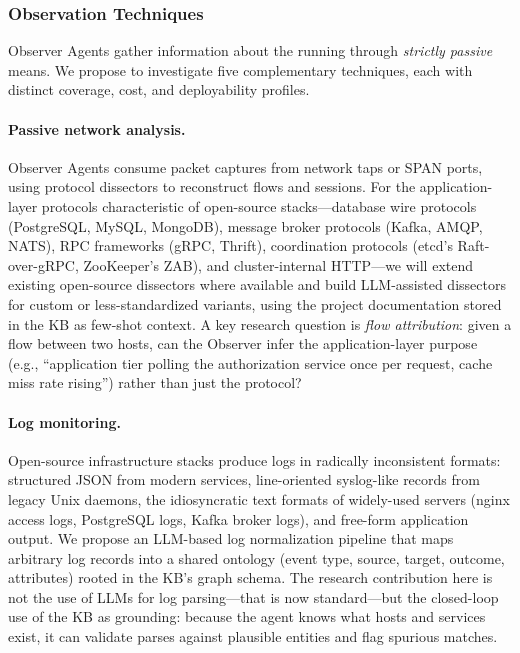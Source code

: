 \subsubsection{Observation Techniques}

Observer Agents gather information about the running \cps through
\emph{strictly passive} means. We propose to investigate five
complementary techniques, each with distinct coverage, cost, and
deployability profiles.

\paragraph{Passive network analysis.}
Observer Agents consume packet captures from network taps or SPAN
ports, using protocol dissectors to reconstruct flows and sessions.
For the application-layer protocols characteristic of open-source
stacks---database wire protocols (PostgreSQL, MySQL, MongoDB), message
broker protocols (Kafka, AMQP, NATS), RPC frameworks (gRPC,
Thrift), coordination protocols (etcd's Raft-over-gRPC,
ZooKeeper's ZAB), and cluster-internal HTTP---we will extend
existing open-source dissectors where available and build LLM-assisted
dissectors for custom or less-standardized variants, using the project
documentation stored in the KB as few-shot context. A key research
question is \emph{flow attribution}: given a flow between two hosts,
can the Observer infer the application-layer purpose (e.g.,
``application tier polling the authorization service once per request,
cache miss rate rising'') rather than just the protocol?

\paragraph{Log monitoring.}
Open-source infrastructure stacks produce logs in radically
inconsistent formats: structured JSON from modern services, line-oriented
syslog-like records from legacy Unix daemons, the idiosyncratic
text formats of widely-used servers (nginx access logs, PostgreSQL
logs, Kafka broker logs), and free-form application output. We
propose an LLM-based log normalization pipeline that
maps arbitrary log records into a shared ontology (event type,
source, target, outcome, attributes) rooted in the KB's graph schema.
The research contribution here is not the use of LLMs for
log parsing---that is now standard---but the closed-loop use of the KB
as grounding: because the agent knows what hosts and services exist,
it can validate parses against plausible entities and flag spurious
matches.

